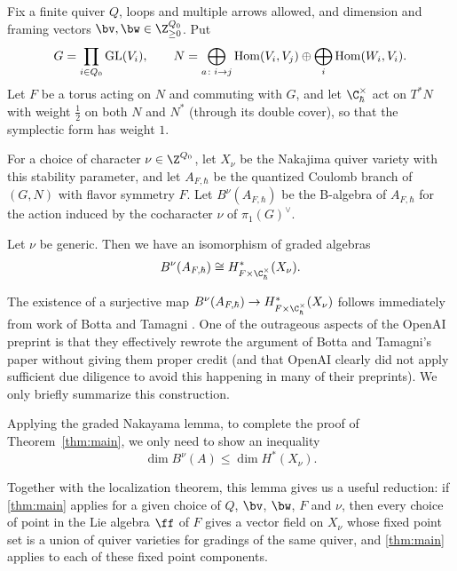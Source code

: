 \documentclass[11pt]{amsart}
\begin{document}

Fix a finite quiver $Q$, loops and multiple arrows allowed, and dimension
and framing vectors $\bv,\bw\in\Z_{\ge0}^{Q_0}$.  Put
\[
 G=\prod_{i\in Q_0}\operatorname{GL}(V_i),\qquad
 N=\bigoplus_{a\colon i\to j}\operatorname{Hom}(V_i,V_j)\oplus\bigoplus_i\operatorname{Hom}(W_i,V_i).
\]
Let $F$ be a torus acting on $N$ and commuting with $G$, and let
$\C^\times_\hbar$ act on $T^*N$ with weight $\frac12$ on both $N$ and $N^*$
(through its double cover), so that the symplectic form has weight $1$. 

For a choice of character $\nu\in\Z^{Q_0}$, let $X_\nu$ be the Nakajima quiver variety with this stability parameter, and let $A_{F,\hbar}$ be the quantized Coulomb branch of $(G,N)$ with flavor symmetry $F$.  Let $B^\nu(A_{F,\hbar})$ be the B-algebra of $A_{F,\hbar}$ for the action induced by the cocharacter $\nu$ of $\pi_1(G)^\vee$.
\begin{theorem}\label{thm:main}
Let $\nu$ be generic.  Then we have an isomorphism of graded algebras
\[B^\nu(A_{F,\hbar})\cong H^*_{F\times\C^\times_\hbar}(X_\nu).\]
\end{theorem}
The existence of a surjective map $B^\nu(A_{F,\hbar})\to H^*_{F\times\C^\times_\hbar}(X_\nu)$ follows immediately from work of Botta and Tamagni \cite{bottaQuasimapCritical2026}. One of the outrageous aspects of the OpenAI preprint is that they effectively rewrote the argument of Botta and Tamagni's paper without giving them proper credit (and that OpenAI clearly did not apply sufficient due diligence to avoid this happening in many of their preprints).  
We only briefly summarize this construction.

Applying the graded Nakayama lemma, to complete the proof of Theorem~\ref{thm:main}, we only need to show an inequality 
\[\dim B^\nu(A)\leq \dim H^*(X_\nu).\]

Together with the localization theorem, this lemma gives us a useful reduction: if \cref{thm:main} applies for a given choice of $Q$, $\bv$, $\bw$, $F$ and $\nu$, then every choice of point in the Lie algebra $\ff$ of $F$ gives a vector field on $X_\nu$ whose fixed point set is a union of quiver varieties for gradings of the same quiver, and \cref{thm:main} applies to each of these fixed point components.  
\end{document}
